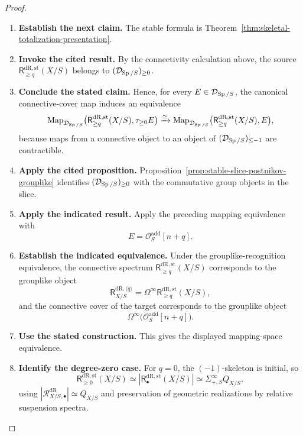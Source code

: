 \begin{proof}
\leavevmode
\begin{enumerate}[label=\textup{(\arabic*)}]
    \item \textbf{Establish the next claim.}
    The stable formula is Theorem~\ref{thm:skeletal-totalization-presentation}.
    \item \textbf{Invoke the cited result.}
    By the
    connectivity calculation above, the source \(\mathsf{R}^{\mathrm{dR},\mathrm{st}}_{\geq q}(X/S)\) belongs to
    \((\mathcal D_{\operatorname{Sp}/S})_{\geq0}\).
    \item \textbf{Conclude the stated claim.}
    Hence, for every \(E\in\mathcal D_{\operatorname{Sp}/S}\), the canonical
    connective-cover map induces an equivalence
    \[
    \operatorname{Map}_{\mathcal D_{\operatorname{Sp}/S}}
    \bigl(\mathsf{R}^{\mathrm{dR},\mathrm{st}}_{\geq q}(X/S),\tau_{\geq0}E\bigr)
    \xrightarrow{\simeq}
    \operatorname{Map}_{\mathcal D_{\operatorname{Sp}/S}}
    \bigl(\mathsf{R}^{\mathrm{dR},\mathrm{st}}_{\geq q}(X/S),E\bigr),
    \]
    because maps from a connective object to an object of
    \((\mathcal D_{\operatorname{Sp}/S})_{\leq-1}\) are contractible.
    \item \textbf{Apply the cited proposition.}
    Proposition~\ref{prop:stable-slice-postnikov-grouplike} identifies
    \((\mathcal D_{\operatorname{Sp}/S})_{\geq0}\) with the commutative group objects in the slice.
    \item \textbf{Apply the indicated result.}
    Apply the preceding mapping equivalence with
    \[
    E=\mathcal O_S^{\mathrm{add}}[n+q].
    \]
    \item \textbf{Establish the indicated equivalence.}
    Under the grouplike-recognition equivalence, the connective spectrum
    \(\mathsf{R}^{\mathrm{dR},\mathrm{st}}_{\geq q}(X/S)\) corresponds to the grouplike object
    \[
    \mathsf{R}^{\mathrm{dR},\langle q\rangle}_{X/S}
    =
    \Omega^\infty \mathsf{R}^{\mathrm{dR},\mathrm{st}}_{\geq q}(X/S),
    \]
    and the connective cover of the target corresponds to the grouplike object
    \[
    \Omega^\infty
    \bigl(\mathcal O_S^{\mathrm{add}}[n+q]\bigr).
    \]
    \item \textbf{Use the stated construction.}
    This gives the displayed mapping-space equivalence.
    \item \textbf{Identify the degree-zero case.}
    For \(q=0\), the \((-1)\)-skeleton is initial, so
    \[
    \mathsf{R}^{\mathrm{dR},\mathrm{st}}_{\geq0}(X/S)
    \simeq
    |\mathsf{R}^{\mathrm{dR},\mathrm{st}}_\bullet(X/S)|
    \simeq
    \Sigma^\infty_{+,S}Q_{X/S},
    \]
    using
    \(|\mathcal R^{\mathrm{dR}}_{X/S,\bullet}|\simeq Q_{X/S}\) and preservation of
    geometric realizations by relative suspension spectra.
\end{enumerate}
\end{proof}

